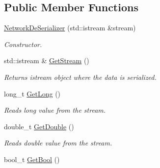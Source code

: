 \subsection*{Public Member Functions}
\begin{DoxyCompactItemize}
\item 
\hypertarget{class_common_1_1_network_de_serializer_a291e095c279f2b58bfc2433afb5a4b13}{\hyperlink{class_common_1_1_network_de_serializer_a291e095c279f2b58bfc2433afb5a4b13}{Network\-De\-Serializer} (std\-::istream \&stream)}\label{class_common_1_1_network_de_serializer_a291e095c279f2b58bfc2433afb5a4b13}

\begin{DoxyCompactList}\small\item\em Constructor. \end{DoxyCompactList}\item 
\hypertarget{class_common_1_1_network_de_serializer_ae5450dc7c8503b1190f0be4426e86d7a}{std\-::istream \& \hyperlink{class_common_1_1_network_de_serializer_ae5450dc7c8503b1190f0be4426e86d7a}{Get\-Stream} ()}\label{class_common_1_1_network_de_serializer_ae5450dc7c8503b1190f0be4426e86d7a}

\begin{DoxyCompactList}\small\item\em Returns istream object where the data is serialized. \end{DoxyCompactList}\item 
\hypertarget{class_common_1_1_network_de_serializer_a3107f346baa11ebadb4ee99713257b20}{long\-\_\-t \hyperlink{class_common_1_1_network_de_serializer_a3107f346baa11ebadb4ee99713257b20}{Get\-Long} ()}\label{class_common_1_1_network_de_serializer_a3107f346baa11ebadb4ee99713257b20}

\begin{DoxyCompactList}\small\item\em Reads long value from the stream. \end{DoxyCompactList}\item 
\hypertarget{class_common_1_1_network_de_serializer_aac6d6a2af87969464cc719d8a35bf2d7}{double\-\_\-t \hyperlink{class_common_1_1_network_de_serializer_aac6d6a2af87969464cc719d8a35bf2d7}{Get\-Double} ()}\label{class_common_1_1_network_de_serializer_aac6d6a2af87969464cc719d8a35bf2d7}

\begin{DoxyCompactList}\small\item\em Reads double value from the stream. \end{DoxyCompactList}\item 
\hypertarget{class_common_1_1_network_de_serializer_a8ec118436044b285a64a2b19f2b94e4e}{bool\-\_\-t \hyperlink{class_common_1_1_network_de_serializer_a8ec118436044b285a64a2b19f2b94e4e}{Get\-Bool} ()}\label{class_common_1_1_network_de_serializer_a8ec118436044b285a64a2b19f2b94e4e}


\end{DoxyCompactItemize}
